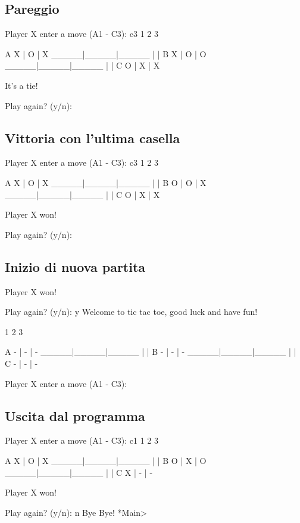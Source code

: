 \documentclass{article}
\begin{document}
\subsection{Pareggio}
    \begin{spverbatim}
    Player X enter a move (A1 - C3): 
    c3
         1     2     3

    A    X  |  O  |  X  
       _____|_____|_____
            |     |     
    B    X  |  O  |  O  
       _____|_____|_____
            |     |     
    C    O  |  X  |  X  

    It's a tie!

    Play again? (y/n):
    \end{spverbatim}

\subsection{Vittoria con l'ultima casella}
    \begin{spverbatim}
    Player X enter a move (A1 - C3): 
    c3
         1     2     3

    A    X  |  O  |  X  
       _____|_____|_____
            |     |     
    B    O  |  O  |  X  
       _____|_____|_____
            |     |     
    C    O  |  X  |  X  

    Player X won!

    Play again? (y/n):
    \end{spverbatim}

\subsection{Inizio di nuova partita}
    \begin{spverbatim}
    Player X won!

    Play again? (y/n):
    y
    Welcome to tic tac toe, good luck and have fun!

         1     2     3

    A    -  |  -  |  -  
       _____|_____|_____
            |     |     
    B    -  |  -  |  -  
       _____|_____|_____
            |     |     
    C    -  |  -  |  -  

    Player X enter a move (A1 - C3): 
    \end{spverbatim}

\subsection{Uscita dal programma}
    \begin{spverbatim}
    Player X enter a move (A1 - C3): 
    c1
         1     2     3

    A    X  |  O  |  X  
       _____|_____|_____
            |     |     
    B    O  |  X  |  O  
       _____|_____|_____
            |     |     
    C    X  |  -  |  -  

    Player X won!

    Play again? (y/n):
    n
    Bye Bye!
    *Main> 
    \end{spverbatim}
\newpage
\end{document}
